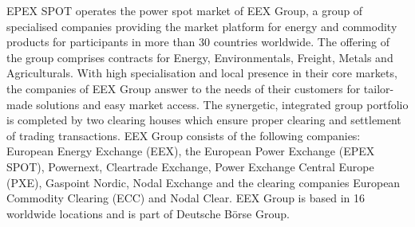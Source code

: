 EPEX SPOT operates the power spot market of EEX Group, a group of specialised companies providing the market platform for energy and commodity products for participants in more than 30 countries worldwide. The offering of the group comprises contracts for Energy, Environmentals, Freight, Metals and Agriculturals. With high specialisation and local presence in their core markets, the companies of EEX Group answer to the needs of their customers for tailor-made solutions and easy market access. The synergetic, integrated group portfolio is completed by two clearing houses which ensure proper clearing and settlement of trading transactions.
EEX Group consists of the following companies: European Energy Exchange (EEX), the European Power Exchange (EPEX SPOT), Powernext, Cleartrade Exchange, Power Exchange Central Europe (PXE), Gaspoint Nordic, Nodal Exchange and the clearing companies European Commodity Clearing (ECC) and Nodal Clear. EEX Group is based in 16 worldwide locations and is part of Deutsche Börse Group.